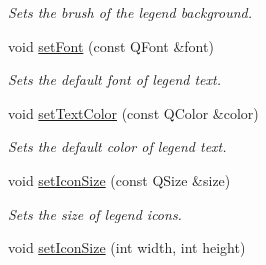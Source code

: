 \begin{DoxyCompactItemize}
\begin{DoxyCompactList}\small\item\em Sets the brush of the legend background. \end{DoxyCompactList}\item 
void \hyperlink{classQCPLegend_aa4cda8499e3cb0f3be415edc02984c73}{set\+Font} (const Q\+Font \&font)
\begin{DoxyCompactList}\small\item\em Sets the default font of legend text. \end{DoxyCompactList}\item 
void \hyperlink{classQCPLegend_ae1eb239ff4a4632fe1b6c3e668d845c6}{set\+Text\+Color} (const Q\+Color \&color)
\begin{DoxyCompactList}\small\item\em Sets the default color of legend text. \end{DoxyCompactList}\item 
void \hyperlink{classQCPLegend_a8b0740cce488bf7010da6beda6898984}{set\+Icon\+Size} (const Q\+Size \&size)
\begin{DoxyCompactList}\small\item\em Sets the size of legend icons. \end{DoxyCompactList}\item 
\hypertarget{classQCPLegend_a96b1a37fd4ee6a9778e6e54fe56ab6c2}{}void \hyperlink{classQCPLegend_a96b1a37fd4ee6a9778e6e54fe56ab6c2}{set\+Icon\+Size} (int width, int height)\label{classQCPLegend_a96b1a37fd4ee6a9778e6e54fe56ab6c2}


\end{DoxyCompactItemize}
